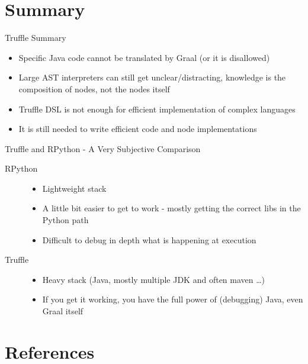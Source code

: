 \documentclass[xcolor=dvipsname,handout]{beamer} %
\begin{document}
\section{Summary}

\begin{frame}{Truffle Summary}
\begin{itemize}
 \item Specific Java code cannot be translated by Graal (or it is disallowed)
 \item Large AST interpreters can still get unclear/distracting, knowledge is the composition of nodes, not the nodes itself
 \item Truffle DSL is not enough for efficient implementation of complex languages
 \item It is still needed to write efficient code and node implementations
\end{itemize}
\end{frame}

\begin{frame}{Truffle and RPython - A Very Subjective Comparison}
\begin{description}
 \item[RPython] \begin{itemize}
  \item Lightweight stack
  \item A little bit easier to get to work - mostly getting the correct libs in the Python path
  \item Difficult to debug in depth what is happening at execution
\end{itemize}
\item[Truffle] \begin{itemize}
  \item Heavy stack (Java, mostly multiple JDK and often maven \dots)
  \item If you get it working, you have the full power of (debugging) Java, even Graal itself
\end{itemize}
\end{description}
\end{frame}


\section{References}
\end{document}
